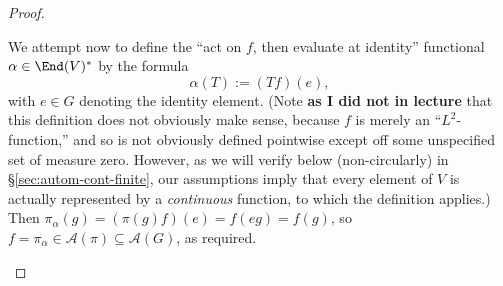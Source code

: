 \documentclass[reqno]{amsart} 
\begin{document}
\begin{proof}
\begin{enumerate}
    We attempt now to define the ``act on $f$, then evaluate at identity'' functional $\alpha \in \End(V)^*$ by the formula
    \begin{equation}\label{eq:evaluate-at-identity-functional}
      \alpha(T) := (T f) (e),
    \end{equation}
    with $e \in G$ denoting the identity element.  (Note {\bf as I did not in lecture} that this definition does not obviously make sense, because $f$ is merely an ``$L^2$-function,'' and so is not obviously defined pointwise except off some unspecified set of measure zero.  However, as we will verify below (non-circularly) in \S\ref{sec:autom-cont-finite}, our assumptions imply that every element of $V$ is actually represented by a \emph{continuous} function, to which the definition applies.)  Then $\pi_\alpha(g) = (\pi(g) f)(e) = f(e g) = f(g)$, so $f = \pi_\alpha \in \mathcal{A}(\pi) \subseteq \mathcal{A}(G)$, as required.
  \end{enumerate}
\end{proof}
\end{document}
